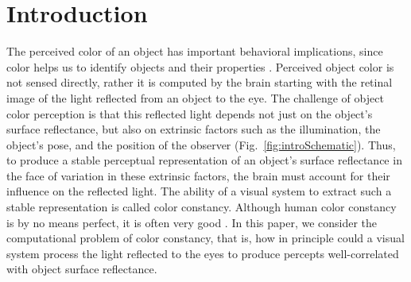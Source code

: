 \documentclass{jov}
\begin{document}
\section{Introduction}
The perceived color of an object has important behavioral implications, since color helps us to identify objects and their properties \cite{Mollon89, Jacobs81}.
Perceived object color is not sensed directly, rather it is computed by the brain starting with the retinal image of the light reflected from an object to the eye.
The challenge of object color perception is that this reflected light depends not just on the object's surface reflectance, but also on extrinsic factors such as the illumination, the object's pose, and the position of the observer (Fig.~\ref{fig:introSchematic}).
Thus, to produce a stable perceptual representation of an object's surface reflectance in the face of variation in these extrinsic factors, the brain must account for their influence on the reflected light.
The ability of a visual system to extract such a stable representation is called color constancy. Although human color constancy is by no means perfect, it is often very good \cite{FosterColorConstancy, BrainardColorConstancy}. 
In this paper, we consider the computational problem of color constancy, that is, how in principle could a visual system process the light reflected to the eyes to produce percepts well-correlated with object surface reflectance.
\end{document}
